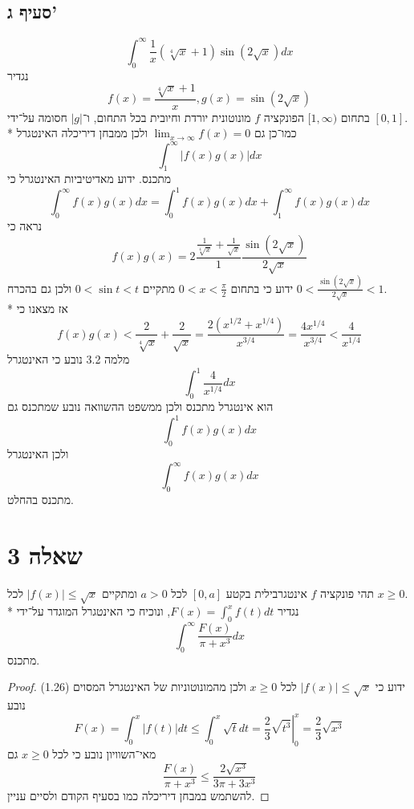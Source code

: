 \subsection{סעיף ג'}
\[
	\int_0^\infty \frac{1}{x} (\sqrt[4]{x} + 1) \sin \left( 2 \sqrt{x} \right) dx
\]
נגדיר
\[
	f(x) = \frac{\sqrt[4]{x} + 1}{x}, g(x) = \sin\left(2\sqrt{x}\right)
\]
בתחום $[1, \infty)$ הפונקציה $f$ מונוטונית יורדת וחיובית בכל התחום, ו־$|g|$ חסומה על־ידי $[0, 1]$. \\* %
כמו־כן גם $\lim_{x \to \infty} f(x) = 0$ ולכן ממבחן דיריכלה האינטגרל
\[
	\int_1^\infty |f(x) g(x)| dx
\] 
מתכנס. ידוע מאדיטיביות האינטגרל כי
\[
	\int_0^\infty f(x) g(x) dx = \int_0^1 f(x) g(x) dx + \int_1^\infty f(x) g(x) dx
\]
נראה כי
\[
	f(x) g(x) = 2\frac{\frac{1}{\sqrt[4]{x}} + \frac{1}{\sqrt{x}}}{1} \frac{\sin(2\sqrt{x})}{2\sqrt{x}}
\]
ידוע כי בתחום $0 < x < \frac{\pi}{2}$ מתקיים $0 < \sin t < t$ ולכן גם בהכרח $0 < \frac{\sin(2 \sqrt{x})}{2 \sqrt{x}} < 1$. \\*
אז מצאנו כי
\[
	f(x) g(x)
	< \frac{2}{\sqrt[4]{x}} + \frac{2}{\sqrt{x}}
	= \frac{2(x^{1/2} + x^{1/4})}{x^{3/4}}
	= \frac{4x^{1/4}}{x^{3/4}}
	< \frac{4}{x^{1/4}}
\]
מלמה 3.2 נובע כי האינטגרל
\[
	\int_0^1 \frac{4}{x^{1/4}} dx
\]
הוא אינטגרל מתכנס ולכן ממשפט ההשוואה נובע שמתכנס גם
\[
	\int_0^1 f(x) g(x) dx
\]
ולכן האינטגרל
\[
	\int_0^\infty f(x) g(x) dx
\]
מתכנס בהחלט.

\section{שאלה 3}
תהי פונקציה $f$ אינטגרבילית בקטע $[0, a]$ לכל $a > 0$ ומתקיים $\lvert f(x) \rvert \le \sqrt{x}$ לכל $x \ge 0$. \\*
נגדיר $F(x) = \int_0^x f(t) dt$, ונוכיח כי האינטגרל המוגדר על־ידי
\[
	\int_0^\infty \frac{F(x)}{\pi + x^3} dx \tag{1}
\]
מתכנס.
\begin{proof}
	ידוע כי $\lvert f(x) \rvert \le \sqrt{x}$ לכל $x \ge 0$ ולכן מהמונוטוניות של האינטגרל המסוים (1.26) נובע
	\[
		F(x) = \int_0^x \lvert f(t) \rvert dt \le \int_0^x \sqrt{t} dt = \left. \frac{2}{3} \sqrt{t^3} \right|_0^x = \frac{2}{3} \sqrt{x^3}
	\]
	מאי־השוויון נובע כי לכל $x \ge 0$ גם
	\[
		\frac{F(x)}{\pi + x^3} \le \frac{2 \sqrt{x^3}}{3 \pi + 3 x^3}
	\]
	להשתמש במבחן דיריכלה כמו בסעיף הקודם ולסיים עניין.
\end{proof}

